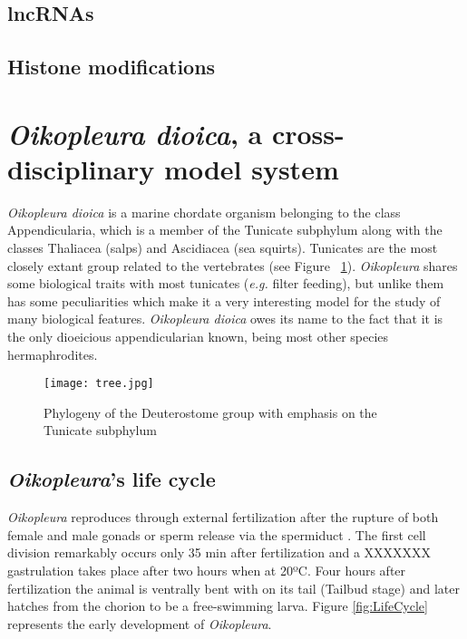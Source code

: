 \documentclass[11pt,twoside,a4paper]{report}
\begin{document}
		\subsection{lncRNAs}
		

		\subsection{Histone modifications}
		

	\section{\textit{Oikopleura dioica}, a cross-disciplinary model system}
		\textit{Oikopleura dioica} is a marine chordate organism belonging to the class Appendicularia, which is a member of the Tunicate subphylum along with the classes Thaliacea (salps) and Ascidiacea (sea squirts). Tunicates are the most closely extant group related to the vertebrates (see Figure ~\ref{fig:tree}). \textit{Oikopleura} shares some biological traits with most tunicates (\textit{e.g.} filter feeding), but unlike them has some peculiarities which make it a very interesting model for the study of many biological features. \textit{Oikopleura dioica} owes its name to the fact that it is the only dioeicious appendicularian known, being most other species hermaphrodites.
		
		\begin{figure}[here]
			\centering
			\texttt{[image: tree.jpg]}
			\caption{Phylogeny of the Deuterostome group with emphasis on the Tunicate subphylum}
			\label{fig:tree}
		\end{figure}
		
		\subsection{	\textit{Oikopleura}'s life cycle}
		\textit{Oikopleura} reproduces through external fertilization after the rupture of both female and male gonads or sperm release via the spermiduct \cite{}. The first cell division remarkably occurs only 35 min after fertilization and a XXXXXXX gastrulation takes place after two hours when at 20ºC. Four hours after fertilization the animal is ventrally bent with on its tail (Tailbud stage) and later hatches from the chorion to be a free-swimming larva. Figure \ref{fig:LifeCycle} represents the early development of \textit{Oikopleura}.
		
\end{document}
